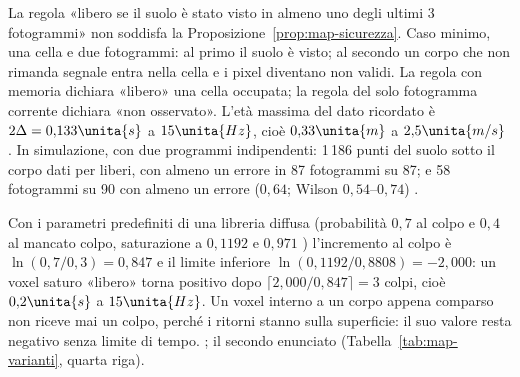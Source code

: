 \begin{controesempio}\label{cex:map-memoria}
La regola «libero se il suolo è stato visto in almeno uno degli ultimi 3 fotogrammi» non soddisfa la Proposizione~\ref{prop:map-sicurezza}. Caso minimo, una cella e due fotogrammi: al primo il suolo è visto; al secondo un corpo che non rimanda segnale entra nella cella e i pixel diventano non validi. La regola con memoria dichiara «libero» una cella occupata; la regola del solo fotogramma corrente dichiara «non osservato». L'età massima del dato ricordato è $2\Delta=0{,}133\unita{s}$ a $15\unita{Hz}$, cioè $0{,}33\unita{m}$ a $2{,}5\unita{m/s}$ . In simulazione, con due programmi indipendenti: 1\,186 punti del suolo sotto il corpo dati per liberi, con almeno un errore in 87 fotogrammi su 87; e 58 fotogrammi su 90 con almeno un errore ($0{,}64$; Wilson $0{,}54$–$0{,}74$) .
\end{controesempio}

\begin{proposizione}\label{prop:map-logodds}
Con i parametri predefiniti di una libreria diffusa (probabilità $0{,}7$ al colpo e $0{,}4$ al mancato colpo, saturazione a $0{,}1192$ e $0{,}971$ \cite{octomap}) l'incremento al colpo è $\ln(0{,}7/0{,}3)=0{,}847$ e il limite inferiore $\ln(0{,}1192/0{,}8808)=-2{,}000$: un voxel saturo «libero» torna positivo dopo $\lceil 2{,}000/0{,}847\rceil=3$ colpi, cioè $0{,}2\unita{s}$ a $15\unita{Hz}$. Un voxel interno a un corpo appena comparso non riceve mai un colpo, perché i ritorni stanno sulla superficie: il suo valore resta negativo senza limite di tempo. ; il secondo enunciato  (Tabella~\ref{tab:map-varianti}, quarta riga).
\end{proposizione}

